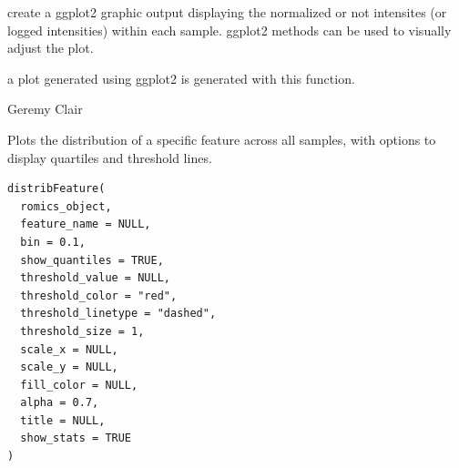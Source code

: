 \documentclass[a4paper]{book}
\begin{document}
%
\begin{Details}
create a ggplot2 graphic output displaying the normalized or not intensites (or logged intensities) within each sample. ggplot2 methods can be used to visually adjust the plot.
\end{Details}
%
\begin{Value}
a plot generated using ggplot2 is generated with this function.
\end{Value}
%
\begin{Author}
Geremy Clair
\end{Author}
%
\begin{Description}
Plots the distribution of a specific feature across all samples, with options to display quartiles and threshold lines.
\end{Description}
%
\begin{Usage}
\begin{verbatim}
distribFeature(
  romics_object,
  feature_name = NULL,
  bin = 0.1,
  show_quantiles = TRUE,
  threshold_value = NULL,
  threshold_color = "red",
  threshold_linetype = "dashed",
  threshold_size = 1,
  scale_x = NULL,
  scale_y = NULL,
  fill_color = NULL,
  alpha = 0.7,
  title = NULL,
  show_stats = TRUE
)
\end{verbatim}
\end{Usage}
%
\end{document}

